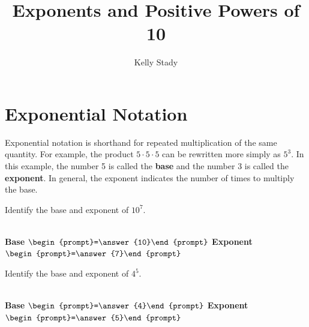 \documentclass{ximera}
\title{Exponents and Positive Powers of 10}   %
\author{Kelly Stady}
\begin{document}
\begin{abstract}

\end{abstract}

\maketitle
\label{xim:ExponentsPowers10Activity}


\section*{Exponential Notation}

Exponential notation is shorthand for repeated multiplication of
the same quantity. For example, the product $5 \cdot 5 \cdot 5$ can be rewritten more simply
as $5^3.$  In this example, the number 5 is called the
\textbf{base} and the number 3 is called the \textbf{exponent}. In
general, the exponent indicates the number of times to multiply
the base.


\begin{problem} Identify the base and exponent of $10^7.$

~ \\[3em]  %

\hspace{2in} \textbf{Base} $\begin{prompt}=\answer{10}\end{prompt}$  \hspace{1in}  \textbf{Exponent} $\begin{prompt}=\answer{7}\end{prompt}$

\end{problem}


\begin{problem} Identify the base and exponent of $4^5.$

~ \\[3em]  %

\hspace{2in} \textbf{Base} $\begin{prompt}=\answer{4}\end{prompt}$  \hspace{1in}  \textbf{Exponent} $\begin{prompt}=\answer{5}\end{prompt}$

\end{problem}
\end{document}
